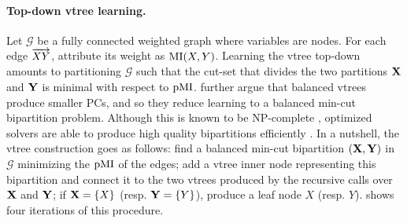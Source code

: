 \paragraph{Top-down vtree learning.} Let $\mathcal{G}$ be a fully connected weighted graph where
variables are nodes. For each edge $\overrightarrow{XY}$, attribute its weight as $\operatorname{\normalfont{MI}}(X,Y)$.
Learning the vtree top-down amounts to partitioning $\mathcal{G}$ such that the cut-set that
divides the two partitions $\mathbf{X}$ and $\mathbf{Y}$ is minimal with respect to $\operatorname{\normalfont{pMI}}$.
\citet{liang17} further argue that balanced vtrees produce smaller PCs, and so they reduce learning
to a balanced min-cut bipartition problem. Although this is known to be NP-complete
\citep{garey90}, optimized solvers are able to produce high quality bipartitions efficiently
\citep{karypsis98}. In a nutshell, the vtree construction goes as follows: find a balanced min-cut
bipartition $(\mathbf{X}, \mathbf{Y})$ in $\mathcal{G}$ minimizing the $\operatorname{\normalfont{pMI}}$ of the edges; add a
vtree inner node representing this bipartition and connect it to the two vtrees produced by the
recursive calls over $\mathbf{X}$ and $\mathbf{Y}$; if $\mathbf{X}=\{X\}$ (resp. $\mathbf{Y}=\{Y\}$), produce
a leaf node $X$ (resp. $Y$).  shows four iterations of this procedure.

